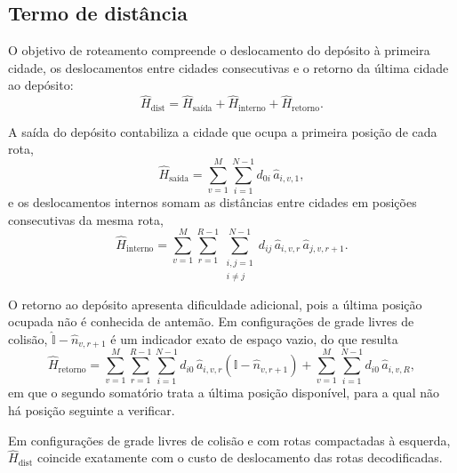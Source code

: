     \subsection{Termo de distância}\label{subsec:form_mod_dist}

        O objetivo de roteamento compreende o deslocamento do depósito à primeira cidade, os deslocamentos entre cidades consecutivas e o retorno da última cidade ao depósito:
        \begin{equation}\label{eq:form_mod_hdist}
            \hat{H}_{\text{dist}} = \hat{H}_{\text{saída}} + \hat{H}_{\text{interno}} + \hat{H}_{\text{retorno}} .
        \end{equation}

        A saída do depósito contabiliza a cidade que ocupa a primeira posição de cada rota,
        \begin{equation}\label{eq:form_mod_hstart}
            \hat{H}_{\text{saída}} = \sum_{v=1}^{M} \sum_{i=1}^{N-1} d_{0i}\, \hat{a}_{i,v,1} ,
        \end{equation}
        \noindent e os deslocamentos internos somam as distâncias entre cidades em posições consecutivas da mesma rota,
        \begin{equation}\label{eq:form_mod_hinternal}
            \hat{H}_{\text{interno}} = \sum_{v=1}^{M} \sum_{r=1}^{R-1}
            \sum_{\substack{i,j=1 \\ i \neq j}}^{N-1} d_{ij}\, \hat{a}_{i,v,r}\, \hat{a}_{j,v,r+1} .
        \end{equation}

        O retorno ao depósito apresenta dificuldade adicional, pois a última posição ocupada não é conhecida de antemão. Em configurações de grade livres de colisão, $\hat{\mathbb{I}} - \hat{n}_{v,r+1}$ é um indicador exato de espaço vazio, do que resulta
        \begin{equation}\label{eq:form_mod_hreturn}
            \hat{H}_{\text{retorno}} = \sum_{v=1}^{M} \sum_{r=1}^{R-1} \sum_{i=1}^{N-1}
            d_{i0}\, \hat{a}_{i,v,r} \left( \hat{\mathbb{I}} - \hat{n}_{v,r+1} \right)
            + \sum_{v=1}^{M} \sum_{i=1}^{N-1} d_{i0}\, \hat{a}_{i,v,R} ,
        \end{equation}
        \noindent em que o segundo somatório trata a última posição disponível, para a qual não há posição seguinte a verificar.

        Em configurações de grade livres de colisão e com rotas compactadas à esquerda, $\hat{H}_{\text{dist}}$ coincide exatamente com o custo de deslocamento das rotas decodificadas.

